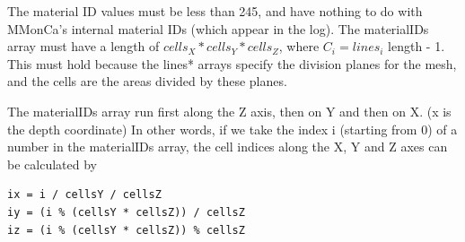 The material ID values must be less than 245, and have nothing to do with MMonCa's internal material IDs (which appear in the log). The materialIDs array must have a length of \(cells_X * cells_Y * cells_Z\), where \(C_i = lines_i\) length - 1. This must hold because the lines* arrays specify the division planes for the mesh, and the cells are the areas divided by these planes.

The materialIDs array run first along the Z axis, then on Y and then on X. (x is the depth coordinate) In other words, if we take the index i (starting from 0) of a number in the materialIDs array, the cell indices along the X, Y and Z axes can be calculated by

\begin{lstlisting}
ix = i / cellsY / cellsZ
iy = (i % (cellsY * cellsZ)) / cellsZ
iz = (i % (cellsY * cellsZ)) % cellsZ
\end{lstlisting}
